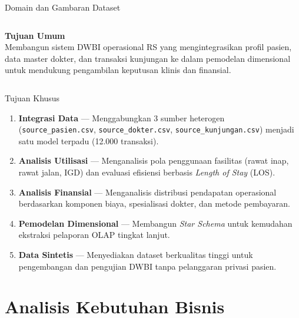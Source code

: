 \documentclass[xcolor=table,t,aspectratio=169]{beamer}
\begin{document}
\begin{frame}{Domain dan Gambaran Dataset}
\begin{columns}[T]
    \vspace{6pt}
    \textbf{Tujuan Umum}\\[2pt]
    \scriptsize Membangun sistem DWBI operasional RS yang mengintegrasikan profil pasien, data master dokter, dan transaksi kunjungan ke dalam pemodelan dimensional untuk mendukung pengambilan keputusan klinis dan finansial.
  \end{columns}
\end{frame}

\begin{frame}{Tujuan Khusus}
  \footnotesize
  \begin{enumerate}
    \item \textbf{Integrasi Data} --- Menggabungkan 3 sumber heterogen (\texttt{source\_pasien.csv}, \texttt{source\_dokter.csv}, \texttt{source\_kunjungan.csv}) menjadi satu model terpadu (12.000 transaksi).
    \vspace{4pt}
    \item \textbf{Analisis Utilisasi} --- Menganalisis pola penggunaan fasilitas (rawat inap, rawat jalan, IGD) dan evaluasi efisiensi berbasis \textit{Length of Stay} (LOS).
    \vspace{4pt}
    \item \textbf{Analisis Finansial} --- Menganalisis distribusi pendapatan operasional berdasarkan komponen biaya, spesialisasi dokter, dan metode pembayaran.
    \vspace{4pt}
    \item \textbf{Pemodelan Dimensional} --- Membangun \textit{Star Schema} untuk kemudahan ekstraksi pelaporan OLAP tingkat lanjut.
    \vspace{4pt}
    \item \textbf{Data Sintetis} --- Menyediakan dataset berkualitas tinggi untuk pengembangan dan pengujian DWBI tanpa pelanggaran privasi pasien.
  \end{enumerate}
\end{frame}

\section{Analisis Kebutuhan Bisnis}
\end{document}
